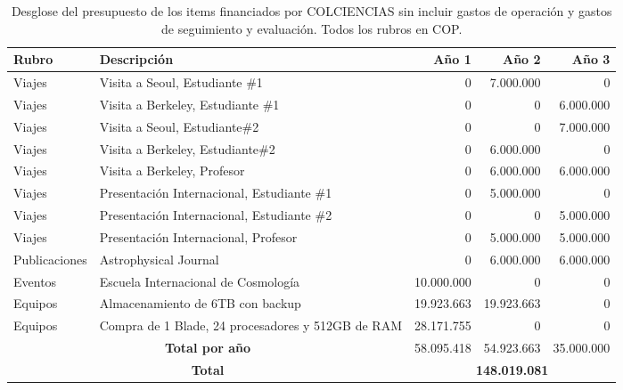 \begin{table}[h]
\begin{center}
\begin{tabular}{|l|p{5.5cm}|r|r|r|}\hline
{\bf Rubro}	&{\bf Descripción}	& {\bf Año 1}	& {\bf Año 2}	& {\bf Año 3}\\\hline
Viajes	&Visita a Seoul, Estudiante \#1	&0	&7.000.000	& 0\\\hline
Viajes	&Visita a Berkeley, Estudiante \#1	&0	&	0&6.000.000\\\hline
Viajes	&Visita a Seoul,  Estudiante\#2	&0	&0	&7.000.000\\\hline
Viajes	&Visita a Berkeley,  Estudiante\#2	&0	&6.000.000	& 0 \\\hline
Viajes	&Visita a Berkeley, Profesor	&0	&6.000.000	&6.000.000\\\hline
Viajes	&Presentación Internacional, Estudiante \#1	&0	&5.000.000	&0\\\hline
Viajes	&Presentación Internacional, Estudiante \#2	&0	&0	&5.000.000\\\hline
Viajes	&Presentación Internacional, Profesor	&0	&5.000.000	&5.000.000\\\hline
Publicaciones	&Astrophysical Journal	&0	&6.000.000	&6.000.000\\\hline
Eventos	&Escuela Internacional de Cosmología	&10.000.000	&0	&0\\\hline
Equipos	&Almacenamiento de 6TB con backup 	&19.923.663	&19.923.663	&0\\\hline
Equipos	&Compra de 1 Blade, 24 procesadores y 512GB de RAM 	&28.171.755	&0	&0\\\hline
\multicolumn{2}{|c|}{{\bf Total por año}}	 & 58.095.418	&54.923.663	&35.000.000 \\\hline
\multicolumn{2}{|c|}{\bf Total } & \multicolumn{3}{|c|}{{\bf 148.019.081}}\\\hline
\end{tabular} 
\caption{Desglose del presupuesto de los items financiados por COLCIENCIAS sin incluir gastos de operaci\'on y gastos de seguimiento y evaluaci\'on. Todos los rubros en COP.}
\end{center}
\label{Resumen Presupuesto Colciencias}
\end{table}


